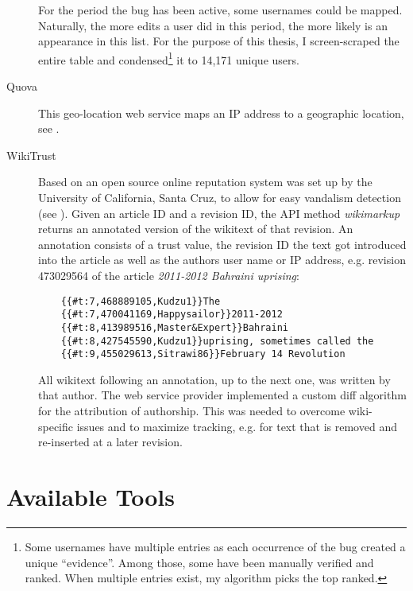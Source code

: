 \begin{description}
For the period the bug has been active, some usernames could be mapped.
Naturally, the more edits a user did in this period, the more likely is an appearance in this list.
For the purpose of this thesis, I screen-scraped the entire table and condensed\footnote{Some usernames have multiple entries as each occurrence of the bug created a unique ``evidence''. Among those, some have been manually verified and ranked. When multiple entries exist, my algorithm picks the top ranked.} it to 14,171 unique users.
\item[Quova] This geo-location web service maps an IP address to a geographic location, see .
\item[WikiTrust] Based on \textcite{adler2008assigning} an open source online reputation system was set up by the University of California, Santa Cruz, to allow for easy vandalism detection (see ).
Given an article ID and a revision ID, the API method \emph{wikimarkup} returns an annotated version of the wikitext of that revision.
An annotation consists of a trust value, the revision ID the text got introduced into the article as well as the authors user name or IP address, e.g. revision 473029564 of the article \emph{2011-2012 Bahraini uprising}:
\begin{lstlisting}
	{{#t:7,468889105,Kudzu1}}The 
	{{#t:7,470041169,Happysailor}}2011-2012 
	{{#t:8,413989516,Master&Expert}}Bahraini 
	{{#t:8,427545590,Kudzu1}}uprising, sometimes called the
	{{#t:9,455029613,Sitrawi86}}February 14 Revolution 
\end{lstlisting}
All wikitext following an annotation, up to the next one, was written by that author.
The web service provider implemented a custom diff algorithm for the attribution of authorship.
This was needed to overcome wiki-specific issues and to maximize tracking, e.g. for text that is removed and re-inserted at a later revision.
\end{description}


\section{Available Tools}

